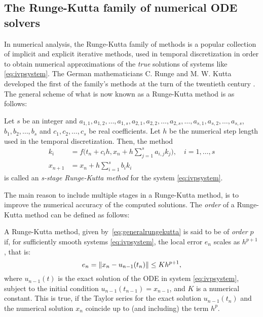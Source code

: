 \subsection{The Runge-Kutta family of numerical ODE solvers}
\label{sub:the_runge_kutta_family_of_numerical_methods}

In numerical analysis, the Runge-Kutta family of methods is a popular
collection of implicit and explicit iterative methods, used in temporal
discretization in order to obtain numerical approximations of the \emph{true}
solutions of systems like \eqref{eq:ivpsystem}. The German mathematicians C.
Runge and M. W. Kutta developed the first of the family's methods at the turn
of the twentieth century \parencite[p.134]{hairer1993solving}. The general
scheme of what is now known as a Runge-Kutta method is as follows: \\

\begin{defn}
    \label{def:generalrungekutta}
    Let $s$ be an integer and $a_{1,1},a_{1,2},\ldots,a_{1,s},a_{2,1},
    a_{2,2},\ldots,a_{2,s},\ldots,a_{s,1},a_{s,2},\ldots,a_{s,s}$,
    $b_{1},b_{2},\ldots,b_{s}$ and $c_{1},c_{2},\ldots,c_{s}$ be real
    coefficients. Let $h$ be the numerical step length used in the
    temporal discretization. Then, the method
\begin{equation}
    \label{eq:generalrungekutta}
    \begin{aligned}
        k_{i} &= f\bigg(t_{n}+c_{i}h,x_{n}+
                h\sum\limits_{j=1}^{s}a_{i,j}k_{j}\bigg),\quad{}i=1,\ldots,s\\
        x_{n+1} &= x_{n} + h\sum\limits_{i=1}^{s}b_{i}k_{i}
    \end{aligned}
\end{equation}
is called an \emph{s-stage Runge-Kutta method} for the system
\eqref{eq:ivpsystem}.
\end{defn}

The main reason to include multiple stages in a Runge-Kutta method,
is to improve the numerical accuracy of the computed solutions.
The \emph{order} of a Runge-Kutta method can be defined as follows:\\

\begin{defn}
    \label{def:rungekuttaorder}
    A Runge-Kutta method, given by~\cref{eq:generalrungekutta} is
    said to be of \emph{order} $p$ if, for sufficiently smooth systems
    \eqref{eq:ivpsystem}, the local error $e_{n}$ scales as $h^{p+1}$, that is:
    \begin{equation}
        \label{eq:rungekuttaorder}
        e_{n}=\norm{x_{n}-u_{n-1}(t_{n})} \leq Kh^{p+1},
    \end{equation}
    where $u_{n-1}(t)$ is the exact solution of the ODE in system
    \eqref{eq:ivpsystem}, subject to the initial condition
    $u_{n-1}(t_{n-1})=x_{n-1}$, and $K$ is a numerical constant. This is true,
    if the Taylor series for the exact solution $u_{n-1}(t_{n})$ and the
    numerical solution $x_{n}$ coincide up to (and including) the term $h^p$.
\end{defn}

